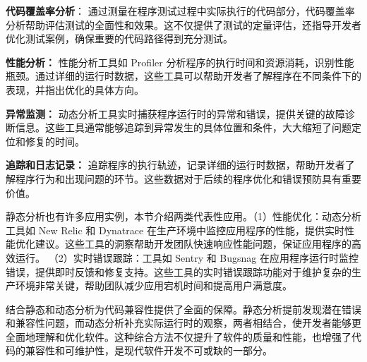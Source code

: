 \textbf{代码覆盖率分析}： 通过测量在程序测试过程中实际执行的代码部分，代码覆盖率分析帮助评估测试的全面性和效果。这不仅提供了测试的定量评估，还指导开发者优化测试案例，确保重要的代码路径得到充分测试。

\textbf{性能分析：} 性能分析工具如 Profiler 分析程序的执行时间和资源消耗，识别性能瓶颈。通过详细的运行时数据，这些工具可以帮助开发者了解程序在不同条件下的表现，并指出优化的具体方向。

\textbf{异常监测：} 动态分析工具实时捕获程序运行时的异常和错误，提供关键的故障诊断信息。这些工具通常能够追踪到异常发生的具体位置和条件，大大缩短了问题定位和修复的时间。

\textbf{追踪和日志记录：} 追踪程序的执行轨迹，记录详细的运行时数据，帮助开发者了解程序行为和出现问题的环节。这些数据对于后续的程序优化和错误预防具有重要价值。

静态分析也有许多应用实例，本节介绍两类代表性应用。（1）性能优化：动态分析工具如 New Relic 和 Dynatrace 在生产环境中监控应用程序的性能，提供实时性能优化建议。这些工具的洞察帮助开发团队快速响应性能问题，保证应用程序的高效运行。
（2）实时错误跟踪：工具如 Sentry 和 Bugsnag 在应用程序运行时监控错误，提供即时反馈和修复支持。这些工具的实时错误跟踪功能对于维护复杂的生产环境非常关键，帮助团队减少应用宕机时间和提高用户满意度。

结合静态和动态分析为代码兼容性提供了全面的保障。静态分析提前发现潜在错误和兼容性问题，而动态分析补充实际运行时的观察，两者相结合，使开发者能够更全面地理解和优化软件。这种综合方法不仅提升了软件的质量和性能，也增强了代码的兼容性和可维护性，是现代软件开发不可或缺的一部分。
